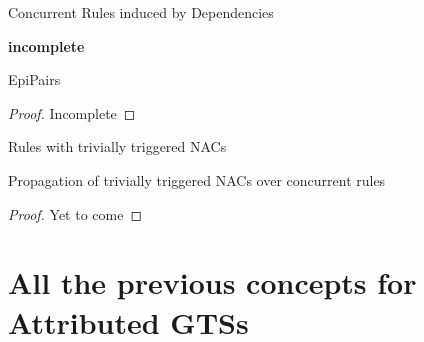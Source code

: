\begin{mydef}{Concurrent Rules induced by Dependencies}

  \textbf{incomplete}

\centerline{
}

\end{mydef}

\begin{thm}{EpiPairs}
  \begin{proof}{Incomplete}
  \end{proof}
\end{thm}


\begin{mydef}{Rules with trivially triggered NACs}
\end{mydef}

\begin{thm}{Propagation of trivially triggered NACs over concurrent rules}
  \begin{proof}{Yet to come}
  \end{proof}
\end{thm}

\section{All the previous concepts for Attributed GTSs}
